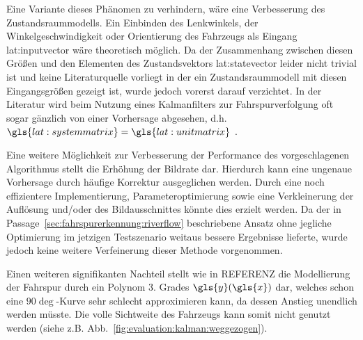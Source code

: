 Eine Variante dieses Phänomen zu verhindern, wäre eine Verbesserung des Zustandsraummodells. 
Ein Einbinden des Lenkwinkels, der Winkelgeschwindigkeit oder Orientierung des Fahrzeugs als Eingang \gls{lat:inputvector} wäre theoretisch möglich. Da der Zusammenhang zwischen diesen Größen und den Elementen des Zustandsvektors \gls{lat:statevector} leider nicht trivial ist und keine Literaturquelle vorliegt in der ein Zustandsraummodell mit diesen Eingangsgrößen gezeigt ist, wurde jedoch vorerst darauf verzichtet. In der Literatur wird beim Nutzung eines Kalmanfilters zur Fahrspurverfolgung oft sogar gänzlich von einer Vorhersage abgesehen, d.h. \(\gls{lat:systemmatrix}=\gls{lat:unitmatrix}\) \autocite{limRiverFlowLane2012}.

Eine weitere Möglichkeit zur Verbesserung der Performance des vorgeschlagenen Algorithmus stellt die Erhöhung der Bildrate dar. Hierdurch kann eine ungenaue Vorhersage durch häufige Korrektur ausgeglichen werden. Durch eine noch effizientere Implementierung, Parameteroptimierung sowie eine Verkleinerung der Auflösung und/oder des Bildausschnittes könnte dies erzielt werden. Da der in Passage~\ref{sec:fahrspurerkennung:riverflow} beschriebene Ansatz ohne jegliche Optimierung im jetzigen Testszenario weitaus bessere Ergebnisse lieferte, wurde jedoch keine weitere Verfeinerung dieser Methode vorgenommen.

Einen weiteren signifikanten Nachteil stellt wie in REFERENZ die Modellierung der Fahrspur durch ein Polynom 3. Grades \(\gls{y}(\gls{x})\) dar, welches schon eine \(90\deg\)-Kurve sehr schlecht approximieren kann, da dessen Anstieg unendlich werden müsste. Die volle Sichtweite des Fahrzeugs kann somit nicht genutzt werden (siehe z.B. Abb.~\ref{fig:evaluation:kalman:weggezogen}).
